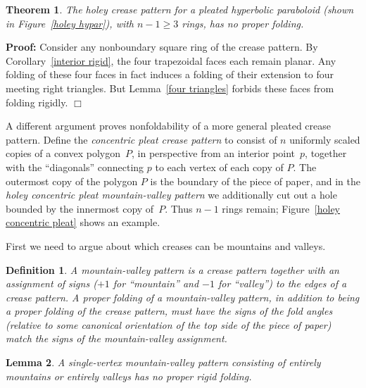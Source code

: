 \documentclass[11pt,letterpaper]{article}
\newtheorem{theorem}{Theorem}
\newtheorem{lemma}[theorem]{Lemma}
\newtheorem{definition}{Definition}
\newenvironment{proof}{\noindent\textbf{Proof: }\ignorespaces}
  {\hspace*{\fill}$\Box$\medskip}
\newcommand\term[1]{\emph{#1}}
\begin{document}
\begin{theorem}
  The holey crease pattern for a pleated hyperbolic paraboloid
  (shown in Figure~\ref{holey hypar}), with $n-1 \geq 3$ rings,
  has no proper folding.
\end{theorem}

\begin{proof}
  Consider any nonboundary square ring of the crease pattern.
  By Corollary~\ref{interior rigid}, the four trapezoidal faces
  each remain planar.  Any folding of these four faces in fact
  induces a folding of their extension to four meeting right triangles.
  But Lemma~\ref{four triangles} forbids these faces from folding rigidly.
\end{proof}

A different argument proves nonfoldability of a more general
pleated crease pattern.  
Define the \term{concentric pleat crease pattern}
to consist of $n$ uniformly scaled copies of a convex polygon~$P$,
in perspective from an interior point~$p$, together with the ``diagonals''
connecting $p$ to each vertex of each copy of $P$.
The outermost copy of the polygon $P$ is the boundary of the piece of paper,
and in the \term{holey concentric pleat mountain-valley pattern}
we additionally cut out a hole bounded by the innermost copy of~$P$.
Thus $n-1$ rings remain;
Figure~\ref{holey concentric pleat} shows an example.

First we need to argue about which creases can be mountains and valleys.

\begin{definition}
  A \term{mountain-valley pattern} is a crease pattern together with
  an assignment of signs ($+1$ for ``mountain'' and $-1$ for ``valley'')
  to the edges of a crease pattern.
  A \term{proper folding} of a mountain-valley pattern,
  in addition to being a proper folding of the crease pattern,
  must have the signs of the fold angles (relative to some canonical
  orientation of the top side of the piece of paper) match the signs of the
  mountain-valley assignment.
\end{definition}

\begin{lemma} \label{not all mountains}
  A single-vertex mountain-valley pattern consisting of entirely mountains
  or entirely valleys has no proper rigid folding.
\end{lemma}
\end{document}
